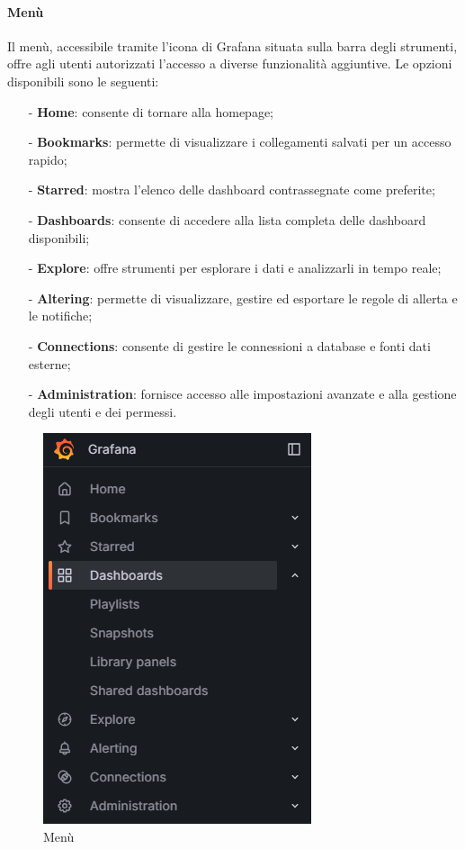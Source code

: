 \documentclass[10pt]{article}
\begin{document}
\begin{justify}
    \paragraph{Menù}
    Il menù, accessibile tramite l'icona di Grafana situata sulla barra degli strumenti, offre agli utenti autorizzati l'accesso a diverse funzionalità aggiuntive. Le opzioni disponibili sono le seguenti:
    \begin{itemize}
        \item[-] \textbf{Home}: consente di tornare alla homepage;
        \item[-] \textbf{Bookmarks}: permette di visualizzare i collegamenti salvati per un accesso rapido;
        \item[-] \textbf{Starred}: mostra l'elenco delle dashboard contrassegnate come preferite;
        \item[-] \textbf{Dashboards}: consente di accedere alla lista completa delle dashboard disponibili;
        \item[-] \textbf{Explore}: offre strumenti per esplorare i dati e analizzarli in tempo reale;
        \item[-] \textbf{Altering}: permette di visualizzare, gestire ed esportare le regole di allerta e le notifiche;
        \item[-] \textbf{Connections}: consente di gestire le connessioni a database e fonti dati esterne;
        \item[-] \textbf{Administration}: fornisce accesso alle impostazioni avanzate e alla gestione degli utenti e dei permessi.
    \end{itemize}
    \begin{figure}[H]
    \centering
    \includegraphics[width=0.35\linewidth]{menu.png}
    \caption{Menù}
    \end{figure}


\end{justify}
\end{document}
